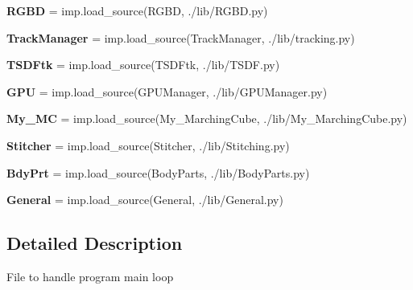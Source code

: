 \begin{DoxyCompactItemize}
\item 
\mbox{\label{namespace_application_a2fbdda0410c38b56264f744c6908835f}} 
{\bfseries R\+G\+BD} = imp.\+load\+\_\+source(\textquotesingle{}R\+G\+BD\textquotesingle{}, \textquotesingle{}./lib/R\+G\+B\+D.\+py\textquotesingle{})
\item 
\mbox{\label{namespace_application_a504993c7a678a17fdbb69a96ad9fef6a}} 
{\bfseries Track\+Manager} = imp.\+load\+\_\+source(\textquotesingle{}Track\+Manager\textquotesingle{}, \textquotesingle{}./lib/tracking.\+py\textquotesingle{})
\item 
\mbox{\label{namespace_application_abfb5c07a5ff0183031a6bfbd0993b799}} 
{\bfseries T\+S\+D\+Ftk} = imp.\+load\+\_\+source(\textquotesingle{}T\+S\+D\+Ftk\textquotesingle{}, \textquotesingle{}./lib/T\+S\+D\+F.\+py\textquotesingle{})
\item 
\mbox{\label{namespace_application_ac45436a85e7dd911ff145a77e6351ef7}} 
{\bfseries G\+PU} = imp.\+load\+\_\+source(\textquotesingle{}G\+P\+U\+Manager\textquotesingle{}, \textquotesingle{}./lib/G\+P\+U\+Manager.\+py\textquotesingle{})
\item 
\mbox{\label{namespace_application_a47a0bc7f73457e9921c018340281cda4}} 
{\bfseries My\+\_\+\+MC} = imp.\+load\+\_\+source(\textquotesingle{}My\+\_\+\+Marching\+Cube\textquotesingle{}, \textquotesingle{}./lib/My\+\_\+\+Marching\+Cube.\+py\textquotesingle{})
\item 
\mbox{\label{namespace_application_a4018729b4cf7db423a9d89e4346c7b92}} 
{\bfseries Stitcher} = imp.\+load\+\_\+source(\textquotesingle{}Stitcher\textquotesingle{}, \textquotesingle{}./lib/Stitching.\+py\textquotesingle{})
\item 
\mbox{\label{namespace_application_aeb29430194fcd06cda11b9f56fb432cd}} 
{\bfseries Bdy\+Prt} = imp.\+load\+\_\+source(\textquotesingle{}Body\+Parts\textquotesingle{}, \textquotesingle{}./lib/Body\+Parts.\+py\textquotesingle{})
\item 
\mbox{\label{namespace_application_a6f9414b74b3dea7e1b3ede67f9ff5d0b}} 
{\bfseries General} = imp.\+load\+\_\+source(\textquotesingle{}General\textquotesingle{}, \textquotesingle{}./lib/General.\+py\textquotesingle{})
\end{DoxyCompactItemize}


\subsection{Detailed Description}
\begin{DoxyVerb}File to handle program main loop
\end{DoxyVerb}
 